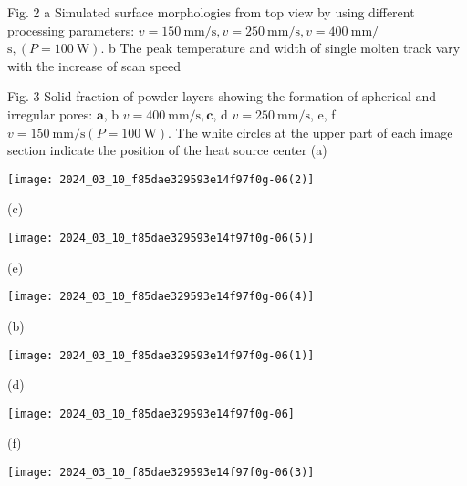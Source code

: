 \documentclass[10pt]{article}
\begin{document}
Fig. 2 a Simulated surface morphologies from top view by using different processing parameters: $v=150 \mathrm{~mm} / \mathrm{s}, v=250 \mathrm{~mm} / \mathrm{s}, v=400 \mathrm{~mm} /$ $\mathrm{s},(P=100 \mathrm{~W})$. b The peak temperature and width of single molten track vary with the increase of scan speed

Fig. 3 Solid fraction of powder layers showing the formation of spherical and irregular pores: $\mathbf{a}$, b $v=400 \mathrm{~mm} / \mathrm{s}, \mathbf{c}$, d $v=250 \mathrm{~mm} / \mathrm{s}$, e, f $v=150 \mathrm{~mm} / \mathrm{s}(P=100 \mathrm{~W})$. The white circles at the upper part of each image section indicate the position of the heat source center (a)

\begin{center}
\texttt{[image: 2024\_03\_10\_f85dae329593e14f97f0g-06(2)]}
\end{center}

(c)

\begin{center}
\texttt{[image: 2024\_03\_10\_f85dae329593e14f97f0g-06(5)]}
\end{center}

(e)

\begin{center}
\texttt{[image: 2024\_03\_10\_f85dae329593e14f97f0g-06(4)]}
\end{center}

(b)

\begin{center}
\texttt{[image: 2024\_03\_10\_f85dae329593e14f97f0g-06(1)]}
\end{center}

(d)

\begin{center}
\texttt{[image: 2024\_03\_10\_f85dae329593e14f97f0g-06]}
\end{center}

(f)

\begin{center}
\texttt{[image: 2024\_03\_10\_f85dae329593e14f97f0g-06(3)]}
\end{center}
\end{document}
